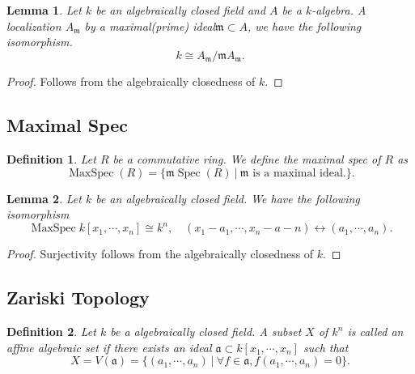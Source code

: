 \documentclass{article}
\newtheorem{definition}{Definition}[section]
\newtheorem{lemma}{Lemma}[section]
\numberwithin{equation}{section}
\DeclareMathOperator{\Spec}{Spec}
\DeclareMathOperator{\MaxSpec}{MaxSpec}
\begin{document}
\begin{lemma}
Let $k$ be an algebraically closed field and $A$ be a $k$-algebra. A localization $A_{\mathfrak{m}}$ by a maximal(prime) ideal$\mathfrak{m}\subset A$, we have the following isomorphism.
\begin{equation*}
k\cong A_{\mathfrak{m}}/\mathfrak{m}A_{\mathfrak{m}}.
\end{equation*}
\label{k_algebra_localization}
\end{lemma}

\begin{proof}
Follows from the algebraically closedness of $k$.%
\end{proof}


\subsection{Maximal Spec}

\begin{definition}
Let $R$ be a commutative ring. We define the maximal spec of $R$ as 
\begin{equation*}
\MaxSpec(R) = \{\mathfrak{m}\Spec(R)\:|\: \mathfrak{m}\text{ is a maximal ideal}.\}.
\end{equation*}
\end{definition}

\begin{lemma}
Let $k$ be an algebraically closed field. We have the following isomorphism
\begin{equation*}
\MaxSpec{k[x_1,\cdots,x_n]}\cong k^n,\quad (x_1-a_1,\cdots,x_n-a-n)\leftrightarrow (a_1,\cdots,a_n).
\end{equation*}
\end{lemma}

\begin{proof}
Surjectivity follows from the algebraically closedness of $k$. %
\end{proof}

\subsection{Zariski Topology}

\begin{definition}
Let $k$ be a algebraically closed field. A subset $X$ of $k^n$ is called an affine algebraic set if there exists an ideal $\mathfrak{a}\subset k[x_1,\cdots,x_n]$ such that
\begin{equation*}
X=V(\mathfrak{a}) = \{(a_1,\cdots,a_n)\:|\: \forall f\in\mathfrak{a}, f(a_1,\cdots,a_n)=0\}.
\end{equation*}
\end{definition}
\end{document}
